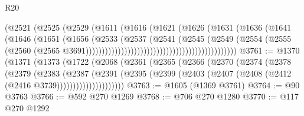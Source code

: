 \begin{lexlean}{R20}
\begin{coremodule}
                                                      (@2521
                                                        (@2525
                                                          (@2529
                                                            (@1611
                                                              (@1616
                                                                (@1621
                                                                  (@1626
                                                                    (@1631
                                                                      (@1636
                                                                        (@1641
                                                                          (@1646
                                                                            (@1651
                                                                              (@1656
                                                                                (@2533
                                                                                  (@2537
                                                                                    (@2541
                                                                                      (@2545
                                                                                        (@2549
                                                                                          (@2554
                                                                                            (@2555
                                                                                              (@2560
                                                                                                (@2565
                                                                                                  @3691)))))))))))))))))))))))))))))))))))))))))))))))
@3761 := @1370
    (@1371
      (@1373
        (@1722
          (@2068
            (@2361
              (@2365
                (@2366
                  (@2370
                    (@2374
                      (@2378
                        (@2379
                          (@2383
                            (@2387
                              (@2391
                                (@2395
                                  (@2399
                                    (@2403 (@2407 (@2408 (@2412 (@2416 @3739)))))))))))))))))))))
@3763 := @1605 (@1369 @3761)
@3764 := @90 @3763
@3766 := @592 @270 @1269
@3768 := @706 @270 @1280
@3770 := @117 @270 @1292

\end{coremodule}
\end{lexlean}

